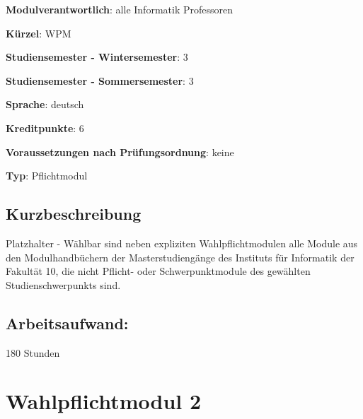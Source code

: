 \begin{modulHead}
\textbf{Modulverantwortlich}: alle Informatik
Professoren
\end{modulHead}
\begin{modulHead}
\textbf{Kürzel}:
WPM
\end{modulHead}
\begin{modulHead}
\textbf{Studiensemester -
Wintersemester}:
3
\end{modulHead}
\begin{modulHead}
\textbf{Studiensemester -
Sommersemester}: 3
\end{modulHead}
\begin{modulHead}
\textbf{Sprache}:
deutsch
\end{modulHead}
\begin{modulHead}
\textbf{Kreditpunkte}:
6
\end{modulHead}
\begin{modulHead}
\textbf{Voraussetzungen nach
Prüfungsordnung}: keine
\end{modulHead}
\begin{modulHead}
\textbf{Typ}:
Pflichtmodul
\end{modulHead}


\section*{Kurzbeschreibung}\label{kurzbeschreibung-4}

Platzhalter - Wählbar sind neben expliziten Wahlpflichtmodulen alle
Module aus den Modulhandbüchern der Masterstudiengänge des Instituts für
Informatik der Fakultät 10, die nicht Pflicht- oder Schwerpunktmodule
des gewählten Studienschwerpunkts sind.

\section*{Arbeitsaufwand:}\label{arbeitsaufwand-6}

180 Stunden

\chapter{Wahlpflichtmodul 2}\label{wahlpflichtmodul-2}

